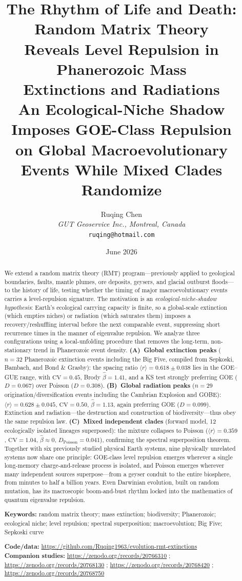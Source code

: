\documentclass[12pt,a4paper]{article}
\title{\textbf{The Rhythm of Life and Death: Random Matrix Theory\\
Reveals Level Repulsion in Phanerozoic Mass\\
Extinctions and Radiations}\\[4pt]
\large An Ecological-Niche Shadow Imposes GOE-Class Repulsion\\
on Global Macroevolutionary Events While Mixed Clades Randomize}
\author{Ruqing Chen\\
\textit{GUT Geoservice Inc., Montreal, Canada}\\
\texttt{ruqing@hotmail.com}}
\date{June 2026}
\begin{document}
\maketitle

\begin{abstract}
We extend a random matrix theory (RMT) program---previously applied to geological boundaries, faults, mantle plumes, ore deposits, geysers, and glacial outburst floods---to the history of life, testing whether the timing of major macroevolutionary events carries a level-repulsion signature. The motivation is an \emph{ecological-niche-shadow hypothesis}: Earth's ecological carrying capacity is finite, so a global-scale extinction (which empties niches) or radiation (which saturates them) imposes a recovery/reshuffling interval before the next comparable event, suppressing short recurrence times in the manner of eigenvalue repulsion. We analyze three configurations using a local-unfolding procedure that removes the long-term, non-stationary trend in Phanerozoic event density. \textbf{(A)~Global extinction peaks} ($n=32$ Phanerozoic extinction events including the Big Five, compiled from Sepkoski, Bambach, and Bond \& Grasby): the spacing ratio $\langle r\rangle=0.618\pm0.038$ lies in the GOE--GUE range, with $\mathrm{CV}=0.45$, Brody $\hat\beta=1.41$, and a KS test strongly preferring GOE ($D=0.067$) over Poisson ($D=0.308$). \textbf{(B)~Global radiation peaks} ($n=29$ origination/diversification events including the Cambrian Explosion and GOBE): $\langle r\rangle=0.628\pm0.045$, $\mathrm{CV}=0.50$, $\hat\beta=1.13$, again preferring GOE ($D=0.099$). Extinction and radiation---the destruction and construction of biodiversity---thus obey the same repulsion law. \textbf{(C)~Mixed independent clades} (forward model, 12 ecologically isolated lineages superposed): the mixture collapses to Poisson ($\langle r\rangle=0.359$, $\mathrm{CV}=1.04$, $\hat\beta\approx0$, $D_{\mathrm{Poisson}}=0.041$), confirming the spectral superposition theorem. Together with six previously studied physical Earth systems, nine physically unrelated systems now share one principle: GOE-class level repulsion emerges wherever a single long-memory charge-and-release process is isolated, and Poisson emerges wherever many independent sources superpose---from a geyser conduit to the entire biosphere, from minutes to half a billion years. Even Darwinian evolution, built on random mutation, has its macroscopic boom-and-bust rhythm locked into the mathematics of quantum eigenvalue repulsion.

\medskip
\noindent\textbf{Keywords:} random matrix theory; mass extinction; biodiversity; Phanerozoic; ecological niche; level repulsion; spectral superposition; macroevolution; Big Five; Sepkoski curve

\medskip
\noindent\textbf{Code/data:} \url{https://github.com/Ruqing1963/evolution-rmt-extinctions}\\
\textbf{Companion studies:} \url{https://zenodo.org/records/20766310} ; \url{https://zenodo.org/records/20768130} ; \url{https://zenodo.org/records/20768420} ; \url{https://zenodo.org/records/20768750}
\end{abstract}
\end{document}

